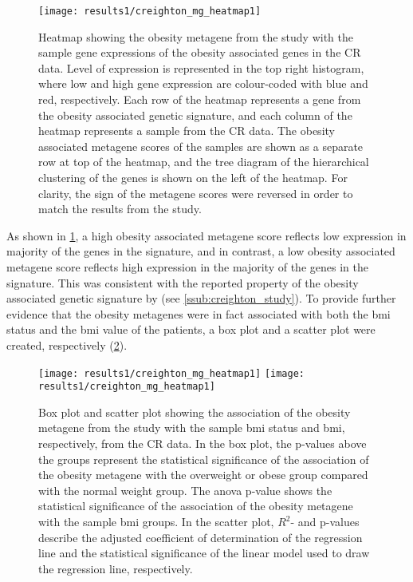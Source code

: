 \begin{figure}[tb!]
	\centering
	\texttt{[image: results1/creighton\_mg\_heatmap1]}
	\caption[Obesity metagene from \citet{Creighton2012} study and sample gene expression in CR data] {Heatmap showing the obesity metagene from the \citet{Creighton2012} study with the sample gene expressions of the obesity associated genes in the CR data.
	Level of expression is represented in the top right histogram, where low and high gene expression are colour-coded with blue and red, respectively.
	Each row of the heatmap represents a gene from the obesity associated genetic signature, and each column of the heatmap represents a sample from the CR data.
	The obesity associated metagene scores of the samples are shown as a separate row at top of the heatmap, and the tree diagram of the hierarchical clustering of the genes is shown on the left of the heatmap.
	For clarity, the sign of the metagene scores were reversed in order to match the results from the \citet{Creighton2012} study.}
	\label{fig:crmetaheat}
\end{figure}

As shown in \cref{fig:crmetaheat}, a high obesity associated metagene score  reflects low expression in majority of the genes in the signature, and in contrast, a low obesity associated metagene score reflects high expression in the majority of the genes in the signature.
This was consistent with the reported property of the obesity associated genetic signature by \citet{Creighton2012} (see \cref{ssub:creighton_study}).
To provide further evidence that the obesity metagenes were in fact associated with both the \gls{bmi} status and the \gls{bmi} value of the patients, a box plot and a scatter plot were created, respectively (\cref{fig:crmetaboxplot}).

\begin{figure}[tb!]
	\centering
	\texttt{[image: results1/creighton\_mg\_heatmap1]}
	\hfill
	\texttt{[image: results1/creighton\_mg\_heatmap1]}
	\caption[Obesity metagene from the \citet{Creighton2012} study and sample \gls{bmi}/\gls{bmi} status in CR data]{Box plot and scatter plot showing the association of the obesity metagene from the \citet{Creighton2012} study with the sample \gls{bmi} status and \gls{bmi}, respectively, from the CR data.
	In the box plot, the p-values above the groups represent the statistical significance of the association of the obesity metagene with the overweight or obese group compared with the normal weight group.
	The \gls{anova} p-value shows the statistical significance of the association of the obesity metagene with the sample \gls{bmi} groups.
	In the scatter plot, $R^2$- and p-values describe the adjusted coefficient of determination of the regression line and the statistical significance of the linear model used to draw the regression line, respectively.}
	\label{fig:crmetaboxplot}
\end{figure}


